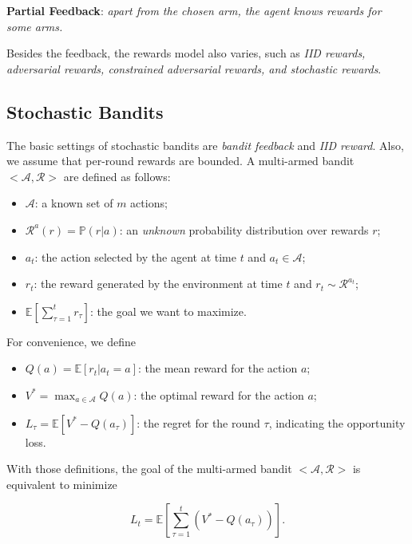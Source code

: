 \documentclass{progartcn}
\begin{document}
			\textbf{Partial Feedback}: \textit{apart from the chosen arm, the agent knows rewards for some arms.}

			Besides the feedback, the rewards model also varies, such as \textit{IID rewards, adversarial rewards, constrained adversarial rewards, and stochastic rewards}.\\

	\subsection{Stochastic Bandits}

			The basic settings of stochastic bandits are \textit{bandit feedback} and \textit{IID reward}. Also, we assume that per-round rewards are bounded. A multi-armed bandit $<\mathcal{A,R}>$ are defined as follows:

			\begin{itemize}[noitemsep,topsep=0pt]
			\item $\mathcal{A}$: a known set of $m$ actions;
			\item $\mathcal{R}^{a}(r)=\mathbb{P}(r|a)$: an \textit{unknown} probability distribution over rewards $r$;
			\item $a_t$: the action selected by the agent at time $t$ and $a_t\in \mathcal{A}$;
			\item $r_t$: the reward generated by the environment at time $t$ and $r_t\sim \mathcal{R}^{a_t}$;
			\item $\mathbb{E}\left[\sum_{\tau=1}^t r_{\tau}\right]$: the goal we want to maximize.\\
			\end{itemize}

			For convenience, we define

			\begin{itemize}[noitemsep,topsep=0pt]
			\item $Q(a)=\mathbb{E}[r_t|a_t=a]$: the mean reward for the action $a$;
			\item $V^\ast=\max_{a\in \mathcal{A}} Q(a)$: the optimal reward for the action $a$;
			\item $L_\tau=\mathbb{E}[V^\ast-Q(a_\tau)]$: the regret for the round $\tau$, indicating the opportunity loss.\\
			\end{itemize}

			With those definitions, the goal of the multi-armed bandit $<\mathcal{A,R}>$ is equivalent to minimize

			\[L_t=\mathbb{E}\left[\sum_{\tau=1}^t(V^\ast-Q(a_\tau))\right].\label{rl_regret}\]
\end{document}
